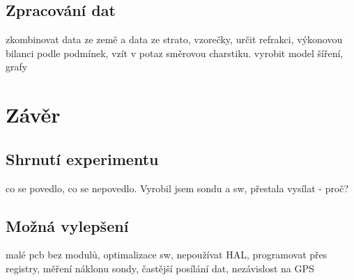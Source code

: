 \documentclass[twoside]{ctuthesis}
\theoremstyle{plain}
\theoremstyle{definition}
\theoremstyle{note}
\begin{document}
	\section{Zpracování dat}
	zkombinovat data ze země a data ze strato, vzorečky, určit refrakci, výkonovou bilanci podle podmínek, vzít v potaz směrovou charstiku. vyrobit model šíření, grafy

	



\chapter{Závěr}
	\section{Shrnutí experimentu}
	co se povedlo, co se nepovedlo. Vyrobil jsem sondu a sw, přestala vysílat - proč? 

	\section{Možná vylepšení}
	malé pcb bez modulů, optimalizace sw, nepoužívat HAL, programovat přes registry, měření náklonu sondy, častější posílání dat, nezávislost na GPS




\appendix

\printindex

\appendix




\end{document}
